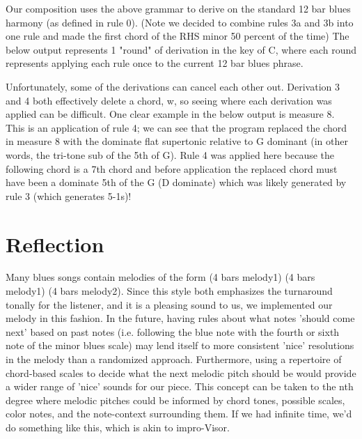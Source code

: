 \documentclass{article}
\begin{document}
Our composition uses the above grammar to derive on the standard 12 bar blues harmony (as defined in rule 0). (Note we decided to combine rules 3a and 3b into one rule and made the first chord of the RHS minor 50 percent of the time) The below output represents 1 "round" of derivation in the key of C, where each round represents applying each rule once to the current 12 bar blues phrase.


\begin {figure}[h]
\centering
\end{figure}

Unfortunately, some of the derivations can cancel each other out. Derivation 3 and 4 both effectively delete a chord, w, so seeing where each derivation was applied can be difficult. One clear example in the below output is measure 8. This is an application of rule 4; we can see that the program replaced the chord in measure 8 with the dominate flat supertonic relative to G dominant (in other words, the tri-tone sub of the 5th of G). Rule 4 was applied here because the following chord is a 7th chord and before application the replaced chord must have been a dominate 5th of the G (D dominate) which was likely generated by rule 3 (which generates 5-1s)!
    
\section{Reflection}

Many blues songs contain melodies of the form (4 bars melody1) (4 bars melody1) (4 bars melody2). Since this style both emphasizes the turnaround tonally for the listener, and it is a pleasing sound to us, we implemented our melody in this fashion. In the future, having rules about what notes 'should come next' based on past notes (i.e. following the blue note with the fourth or sixth note of the minor blues scale) may lend itself to more consistent 'nice' resolutions in the melody than a randomized approach. Furthermore, using a repertoire of chord-based scales to decide what the next melodic pitch should be would provide a wider range of 'nice' sounds for our piece. This concept can be taken to the nth degree where melodic pitches could be informed by chord tones, possible scales, color notes, and the note-context surrounding them. If we had infinite time, we'd do something like this, which is akin to impro-Visor. 
\end{document}
